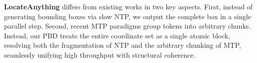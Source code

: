 \textbf{LocateAnything} differs from existing works in two key aspects. First, instead of generating bounding boxes via slow NTP, we output the complete box in a single parallel step.
Second, recent MTP paradigms group tokens into arbitrary chunks.
Instead, our PBD treats the entire coordinate set as a single atomic block, resolving both the fragmentation of NTP and the arbitrary chunking of MTP, seamlessly unifying high throughput with structural coherence.
